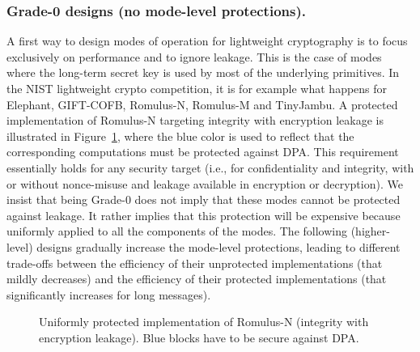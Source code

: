 \documentclass{llncs}
\begin{document}
\subsubsection{Grade-0 designs (no mode-level protections).}
A first way to design modes of operation for lightweight cryptography 
is to focus exclusively on performance and to ignore leakage. This
is the case of modes where the long-term secret key is
used by most of the underlying primitives. In the NIST lightweight
crypto competition, it is for example what happens for
Elephant, GIFT-COFB, Romulus-N, Romulus-M and TinyJambu.
A protected implementation of Romulus-N targeting integrity with encryption leakage
is illustrated in Figure~\ref{fig:romulus_n},
where the blue color is used to reflect that the corresponding computations
must be protected against DPA. This requirement essentially holds for any security target (i.e., for confidentiality
and integrity, with or without nonce-misuse and leakage available in encryption or decryption).
We insist that being
Grade-0 does not imply that these modes cannot be protected against
leakage. It rather implies that this protection will be expensive
because uniformly applied to all the components of the modes.
The following (higher-level) designs gradually increase the mode-level protections,
leading to different trade-offs between the efficiency of their
unprotected implementations (that mildly decreases) and the efficiency
of their protected implementations (that significantly increases for long messages).


\begin{figure}
    \centering
    
	\caption{Uniformly protected implementation of Romulus-N (integrity with encryption leakage).
	Blue blocks have to be secure against DPA.}
        \label{fig:romulus_n}\vspace*{-0.5cm}
\end{figure}
\end{document}
